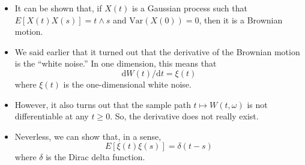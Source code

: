\documentclass[10pt]{article}
\newcommand{\dee}{\mathrm{d}}
\newcommand{\mrm}[1]{\mathrm{#1}}
\newcommand{\mcal}[1]{\mathcal{#1}}
\begin{document}
\begin{itemize}
  \begin{proof}
    Note that, because $W(\cdot)$ is the standard Brownian motion, we have that $W(t) \sim \mcal{N}(0,t)$. So, obviously, $E[W(t)] = 0$. Moreover, we have that $$E[W^2(t)] = E[W^2(t)] - 0 = E[W^2(t)] - E[(W(t))^2] = \mrm{Var}(W(t)) = t.$$
    Now, Assume $t \geq s \geq 0$. We have that.
    \begin{align*}
      E[W(t)W(s)] 
      &= E[(W(s) + W(t) - W(s))W(s)] \\
      &= E[W^2(s)] + E[(W(t) - W(s))W(s)] \\
      &= s + E[(W(t)-W(s))(W(s)-W(0))] \\
      &= s + E[W(t)-W(s)]E[W(s)-W(0)] \\
      &= s + (E[W(t)] - E[W(s)])(E[W(s)] - E[W(0)]) \\
      &= s = \min(t,s) = t \wedge s
    \end{align*}
    as required.    
  \end{proof}

  \item It can be shown that, if $X(t)$ is a Gaussian process such that $E[X(t)X(s)] = t \wedge s$ and $\mrm{Var}(X(0)) = 0$, then it is a Brownian motion.
  
  \item We said earlier that it turned out that the derivative of the Brownian motion is the ``white noise.'' In one dimension, this means that $$\dee W(t) / \dee t = \xi(t)$$ where $\xi(t)$ is the one-dimensional white noise.
  
  \item However, it also turns out that the sample path $t \mapsto W(t,\omega)$ is not differentiable at any $t \geq 0$. So, the derivative does not really exist.

  \item Neverless, we can show that, in a sense, $$E[\xi(t)\xi(s)] = \delta(t-s)$$ where $\delta$ is the Dirac delta function. 
  

\end{itemize}
\end{document}
